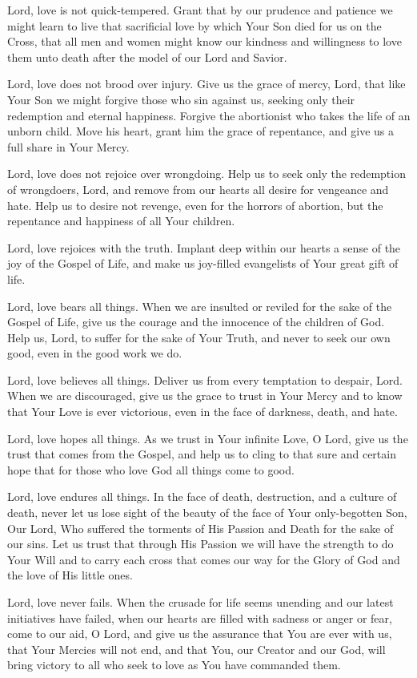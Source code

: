\documentclass[12pt]{article}
\begin{document}
Lord, love is not quick-tempered.
Grant that by our prudence and patience we might learn to live that sacrificial love by which Your Son died for us on the Cross, that all men and women might know our kindness and willingness to love them unto death after the model of our Lord and Savior.

Lord, love does not brood over injury.
Give us the grace of mercy, Lord, that like Your Son we might forgive those who sin against us, seeking only their redemption and eternal happiness.
Forgive the abortionist who takes the life of an unborn child.
Move his heart, grant him the grace of repentance, and give us a full share in Your Mercy.

Lord, love does not rejoice over wrongdoing.
Help us to seek only the redemption of wrongdoers, Lord, and remove from our hearts all desire for vengeance and hate.
Help us to desire not revenge, even for the horrors of abortion, but the repentance and happiness of all Your children.

Lord, love rejoices with the truth.
Implant deep within our hearts a sense of the joy of the Gospel of Life, and make us joy-filled evangelists of Your great gift of life.

Lord, love bears all things.
When we are insulted or reviled for the sake of the Gospel of Life, give us the courage and the innocence of the children of God.
Help us, Lord, to suffer for the sake of Your Truth, and never to seek our own good, even in the good work we do.

Lord, love believes all things.
Deliver us from every temptation to despair, Lord. When we are discouraged, give us the grace to trust in Your Mercy and to know that Your Love is ever victorious, even in the face of darkness, death, and hate.

Lord, love hopes all things.
As we trust in Your infinite Love, O Lord, give us the trust that comes from the Gospel, and help us to cling to that sure and certain hope that for those who love God all things come to good.

Lord, love endures all things.
In the face of death, destruction, and a culture of death, never let us lose sight of the beauty of the face of Your only-begotten Son, Our Lord, Who suffered the torments of His Passion and Death for the sake of our sins.
Let us trust that through His Passion we will have the strength to do Your Will and to carry each cross that comes our way for the Glory of God and the love of His little ones.

Lord, love never fails.
When the crusade for life seems unending and our latest initiatives have failed, when our hearts are filled with sadness or anger or fear, come to our aid, O Lord, and give us the assurance that You are ever with us, that Your Mercies will not end, and that You, our Creator and our God, will bring victory to all who seek to love as You have commanded them.
\end{document}
